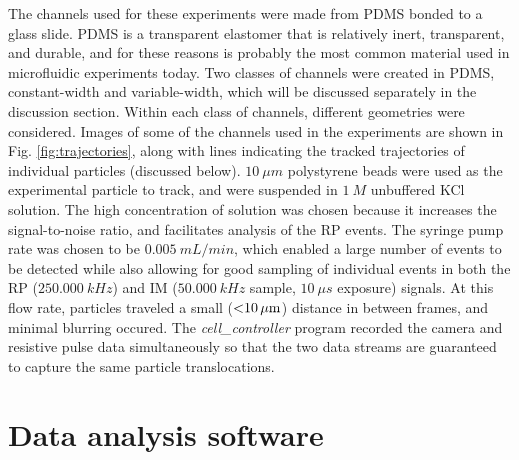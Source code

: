 		The channels used for these experiments were made from PDMS bonded to a glass slide. PDMS is a transparent elastomer that is relatively inert, transparent, and durable, and for these reasons is probably the most common material used in microfluidic experiments today. Two classes of channels were created in PDMS, constant-width and variable-width, which will be discussed separately in the discussion section. Within each class of channels, different geometries were considered. Images of some of the channels used in the experiments are shown in Fig. \ref{fig:trajectories}, along with lines indicating the tracked trajectories of individual particles (discussed below). $\SI{10}{\mu m}$ polystyrene beads were used as the experimental particle to track, and were suspended in $\SI{1}{M}$ unbuffered KCl solution. The high concentration of solution was chosen because it increases the signal-to-noise ratio, and facilitates analysis of the RP events. The syringe pump rate was chosen to be $\SI{0.005}{mL/min}$, which enabled a large number of events to be detected while also allowing for good sampling of individual events in both the RP ($\SI{250,000}{kHz}$) and IM ($\SI{50,000}{kHz}$ sample, $\SI{10}{\mu s}$ exposure) signals. At this flow rate, particles traveled a small ($\SI{<10}{\mu m}$) distance in between frames, and minimal blurring occured. The \textit{cell\_controller} program recorded the camera and resistive pulse data simultaneously so that the two data streams are guaranteed to capture the same particle translocations.
		
	\section{Data analysis software}
		
